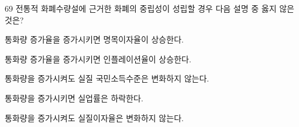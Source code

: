 \begin{question}{69}
전통적 화폐수량설에 근거한 화폐의 중립성이 성립할 경우 다음 설명 중 옳지 않은 것은?
\begin{choices}
  \item 통화량 증가율을 증가시키면 명목이자율이 상승한다.
  \item 통화량 증가율을 증가시키면 인플레이션율이 상승한다.
  \item 통화량을 증가시켜도 실질 국민소득수준은 변화하지 않는다.
  \item 통화량을 증가시키면 실업률은 하락한다.
  \item 통화량을 증가시켜도 실질이자율은 변화하지 않는다.
\end{choices}
\end{question}
